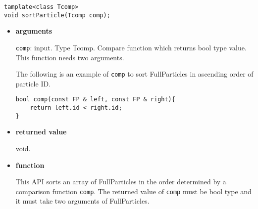 \label{sec:ParticleSystem:sortParticle}

\begin{screen}
\begin{verbatim}
tamplate<class Tcomp>
void sortParticle(Tcomp comp);
\end{verbatim}
\end{screen}

\begin{itemize}

\item {\bf arguments}

{\tt comp}: input. Type Tcomp. Compare function which returns bool
type value. This function needs two arguments.

The following is an example of {\tt comp} to sort FullParticles in
ascending order of particle ID.


\begin{verbatim}
bool comp(const FP & left, const FP & right){
    return left.id < right.id;
}
\end{verbatim}

\item {\bf returned value}

void.


\item {\bf function}

This API sorts an array of FullParticles in the order determined by a
comparison function {\tt comp}. The returned value of {\tt comp} must
be bool type and it must take two arguments of FullParticles.


\end{itemize}
